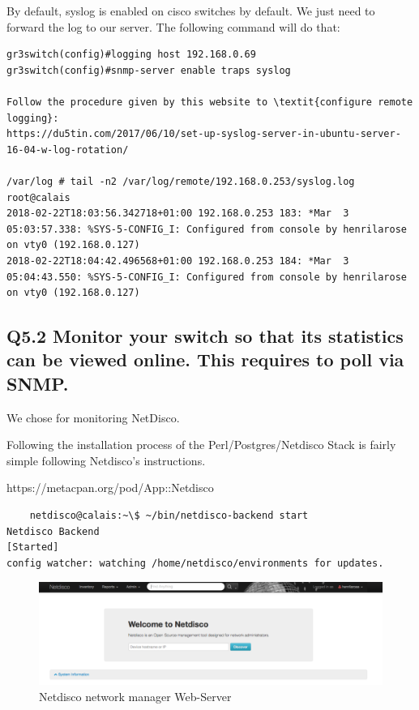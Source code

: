 \documentclass{article}
\begin{document}
By default, syslog is enabled on cisco switches by default. We just need to forward the log to our server. The following command will do that:

\begin{verbatim}
gr3switch(config)#logging host 192.168.0.69
gr3switch(config)#snmp-server enable traps syslog

Follow the procedure given by this website to \textit{configure remote logging}:
https://du5tin.com/2017/06/10/set-up-syslog-server-in-ubuntu-server-16-04-w-log-rotation/

/var/log # tail -n2 /var/log/remote/192.168.0.253/syslog.log                                                                                                             root@calais
2018-02-22T18:03:56.342718+01:00 192.168.0.253 183: *Mar  3 05:03:57.338: %SYS-5-CONFIG_I: Configured from console by henrilarose on vty0 (192.168.0.127)
2018-02-22T18:04:42.496568+01:00 192.168.0.253 184: *Mar  3 05:04:43.550: %SYS-5-CONFIG_I: Configured from console by henrilarose on vty0 (192.168.0.127)
\end{verbatim}

\subsection{Q5.2 Monitor your switch so that its statistics can be viewed online. This requires to poll via
SNMP.}

We chose for monitoring NetDisco.

Following the installation process of the Perl/Postgres/Netdisco Stack is fairly simple following Netdisco's instructions.

https://metacpan.org/pod/App::Netdisco

\begin{verbatim}
    netdisco@calais:~\$ ~/bin/netdisco-backend start
Netdisco Backend                                              [Started]
config watcher: watching /home/netdisco/environments for updates.
\end{verbatim}

\begin{figure}[H]
\centering
\includegraphics[width=17cm]{figures/screenshot_netdisco.png}
\caption{Netdisco network manager Web-Server}
\centering
\label{fig:dscp_marker}
\end{figure}
\end{document}
